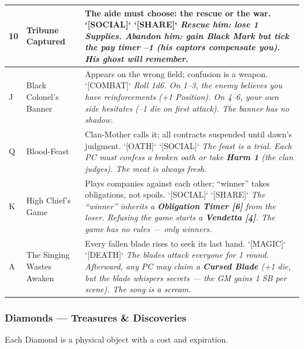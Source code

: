 \begin{longtable}{|p{}|p{}|p{}|}
\hline
10 & Tribune Captured & The aide must choose: the rescue or the war. `[SOCIAL]` `[SHARE]` \textit{Rescue him: lose 1 \textbf{Supplies}. Abandon him: gain \textbf{Black Mark} but tick the pay timer --1 (his captors compensate you). His ghost will remember.} \\
\hline
J & Black Colonel's Banner & Appears on the wrong field; confusion is a weapon. `[COMBAT]` \textit{Roll 1d6. On 1--3, the enemy believes you have reinforcements (+1 Position). On 4--6, your own side hesitates (--1 die on first attack). The banner has no shadow.} \\
\hline
Q & Blood-Feast & Clan-Mother calls it; all contracts suspended until dawn's judgment. `[OATH]` `[SOCIAL]` \textit{The feast is a trial. Each PC must confess a broken oath or take \textbf{Harm 1} (the clan judges). The meat is always fresh.} \\
\hline
K & High Chief's Game & Plays companies against each other; ``winner'' takes obligations, not spoils. `[SOCIAL]` `[SHARE]` \textit{The ``winner'' inherits a \textbf{Obligation Timer [6]} from the loser. Refusing the game starts a \textbf{Vendetta [4]}. The game has no rules --- only winners.} \\
\hline
A & The Singing Wastes Awaken & Every fallen blade rises to seek its last hand. `[MAGIC]` `[DEATH]` \textit{The blades attack everyone for 1 round. Afterward, any PC may claim a \textbf{Cursed Blade} (+1 die, but the blade whispers secrets --- the GM gains 1 SB per scene). The song is a scream.} \\
\hline
\end{longtable}

\subsubsection*{Diamonds --- Treasures \& Discoveries}

Each Diamond is a physical object with a cost and expiration.

